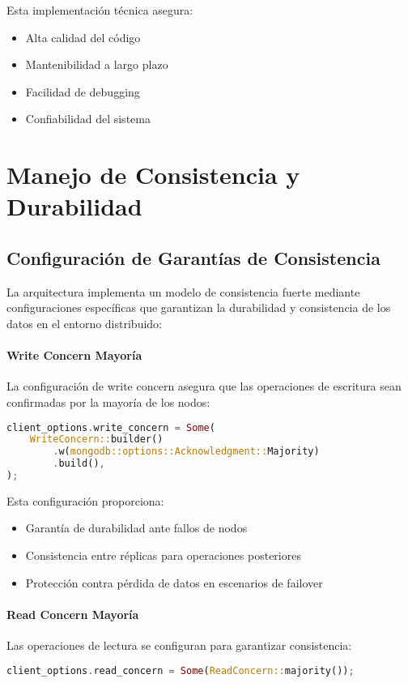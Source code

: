 \documentclass[12pt,letterpaper]{article}
\begin{document}
Esta implementación técnica asegura:
\begin{itemize}
    \item Alta calidad del código
    \item Mantenibilidad a largo plazo
    \item Facilidad de debugging
    \item Confiabilidad del sistema
\end{itemize}
\section{Manejo de Consistencia y Durabilidad}
\subsection{Configuración de Garantías de Consistencia}
La arquitectura implementa un modelo de consistencia fuerte mediante configuraciones específicas que garantizan la durabilidad y consistencia de los datos en el entorno distribuido:

\paragraph{Write Concern Mayoría}
La configuración de write concern asegura que las operaciones de escritura sean confirmadas por la mayoría de los nodos:

\begin{lstlisting}[language=rust]
client_options.write_concern = Some(
    WriteConcern::builder()
        .w(mongodb::options::Acknowledgment::Majority)
        .build(),
);
\end{lstlisting}

Esta configuración proporciona:
\begin{itemize}
    \item Garantía de durabilidad ante fallos de nodos
    \item Consistencia entre réplicas para operaciones posteriores
    \item Protección contra pérdida de datos en escenarios de failover
\end{itemize}

\paragraph{Read Concern Mayoría}
Las operaciones de lectura se configuran para garantizar consistencia:

\begin{lstlisting}[language=rust]
client_options.read_concern = Some(ReadConcern::majority());
\end{lstlisting}
\end{document}
